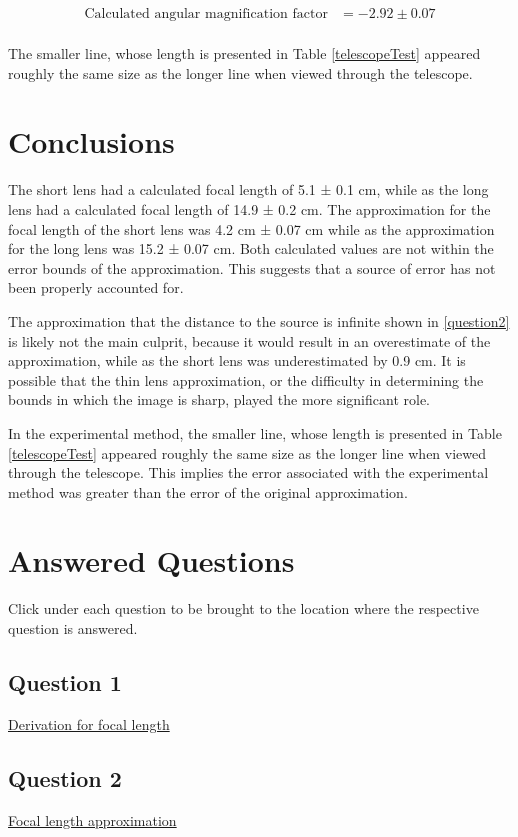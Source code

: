 \documentclass{report}
\begin{document}
\begin{equation*}
    \begin{aligned}
        \text{Calculated angular magnification factor}   & = -2.92 \pm 0.07  \\
    \end{aligned}
\end{equation*}

The smaller line, whose length is presented in Table \ref{telescopeTest} appeared roughly the same size as the longer line when viewed through the telescope.




\chapter{Conclusions}



The short lens had a calculated focal length of 5.1 ± 0.1 cm, while as the long lens had a calculated focal length of 14.9 ± 0.2 cm. 
The approximation for the focal length of the short lens was 4.2 cm ± 0.07 cm while as the approximation for the long lens was 15.2 ± 0.07 cm. Both calculated values are not within the error bounds of the approximation. This suggests that a source of error has not been properly accounted for.

The approximation that the distance to the source is infinite shown in \ref{question2} is likely not the main culprit, because it would result in an overestimate of the approximation, while as the short lens was underestimated by 0.9 cm. It is possible that the thin lens approximation, or the difficulty in determining the bounds in which the image is sharp, played the more significant role.

In the experimental method, the smaller line, whose length is presented in Table \ref{telescopeTest} appeared roughly the same size as the longer line when viewed through the telescope. This implies the error associated with the experimental method was greater than the error of the original approximation.




\chapter{Answered Questions}



Click under each question to be brought to the location where the respective question is answered.

\section{Question 1}
\hyperref[question1]{Derivation for focal length}

\section{Question 2}
\hyperref[question2]{Focal length approximation}
\end{document}
